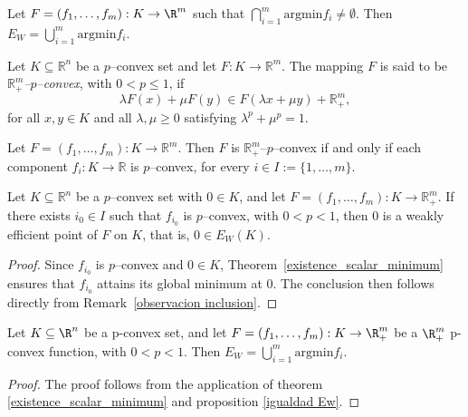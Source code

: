 \documentclass[10pt]{article}
\begin{document}
\begin{proposition}[\cite{FV2}] Let $F=(f_{1},\ldots,f_{m}):K\rightarrow \R^{m}$ such that $\displaystyle \bigcap_{i=1}^{m}\mathrm{argmin}{f_{i}}\neq \emptyset$. Then $\displaystyle E_{W}=\bigcup_{i=1}^{m}\mathrm{argmin}{f_{i}}$. 
\label{igualdad Ew}
\end{proposition}
\begin{definition}
Let $K \subseteq \mathbb{R}^n$ be a $p$--convex set and let $F:K \to \mathbb{R}^m$.
The mapping $F$ is said to be \emph{$\mathbb{R}^m_{+}$--$p$--convex}, with $0<p\le 1$,
if
\[
\lambda F(x) + \mu F(y)
\in
F(\lambda x + \mu y) + \mathbb{R}^m_{+},
\]
for all $x,y \in K$ and all $\lambda,\mu \ge 0$ satisfying
$\lambda^{p} + \mu^{p} = 1$.
\end{definition}
\begin{remark}
Let $F=(f_1,\ldots,f_m):K\to\mathbb{R}^m$.
Then $F$ is $\mathbb{R}^m_{+}$--$p$--convex if and only if each component
$f_i:K\to\mathbb{R}$ is $p$--convex, for every $i\in I:=\{1,\ldots,m\}$.
\end{remark}
\begin{corollary}
Let $K \subseteq \mathbb{R}^n$ be a $p$--convex set with $0\in K$, and let
$F=(f_1,\ldots,f_m):K\to\mathbb{R}^m_{+}$.
If there exists $i_0\in I$ such that $f_{i_0}$ is $p$--convex, with $0<p<1$,
then $0$ is a weakly efficient point of $F$ on $K$, that is,
$0\in E_W(K)$.
\label{0 en Ew}
\end{corollary}
\begin{proof}
Since $f_{i_0}$ is $p$--convex and $0\in K$, Theorem~\ref{existence_scalar_minimum}
ensures that $f_{i_0}$ attains its global minimum at $0$.
The conclusion then follows directly from
Remark~\ref{observacion inclusion}.
\end{proof}

\begin{corollary} Let $K\subseteq \R^{n}$ be a p-convex set, and let $F=(f_{1},\ldots,f_{m}):K\rightarrow \R^{m}_{+}$ be  a  $\R^{m}_{+}$ p-convex function, with $0<p<1$. Then $\displaystyle E_{W}=\bigcup_{i=1}^{m}\mathrm{argmin}{f_{i}}$.
\end{corollary}
\begin{proof}
The proof follows from the application of theorem \ref{existence_scalar_minimum} and proposition \ref{igualdad Ew}.
\end{proof}
\end{document}
